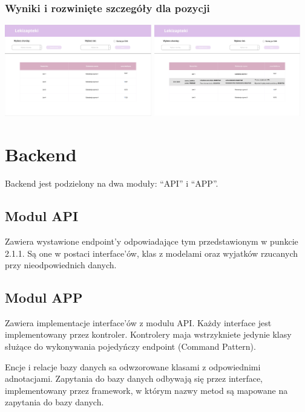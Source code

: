 \documentclass{article}
\begin{document}
      \subsubsection{Wyniki i rozwinięte szczegóły dla pozycji}
      \includegraphics[width=6.4cm, height=4cm]{lekizapteki-leki-identyczne}
      \includegraphics[width=6.4cm, height=4cm]{lekizapteki-leki-identyczne-rozwiniete}

  \section{Backend}
  Backend jest podzielony na dwa moduły: ``API'' i ``APP''.

    \subsection{Modul API}
    Zawiera wystawione endpoint'y odpowiadające tym przedstawionym w punkcie 2.1.1.
    Są one w postaci interface'ów, klas z modelami oraz wyjatków rzucanych przy nieodpowiednich danych.

    \subsection{Modul APP}
    Zawiera implementacje interface'ów z modulu API.
    Każdy interface jest implementowany przez kontroler.
    Kontrolery maja wstrzykniete jedynie klasy służące do wykonywania pojedyńczy endpoint (Command Pattern).

    Encje i relacje bazy danych sa odwzorowane klasami z odpowiednimi adnotacjami.
    Zapytania do bazy danych odbywają się przez interface, implementowany przez framework,
    w którym nazwy metod są mapowane na zapytania do bazy danych.
\end{document}
